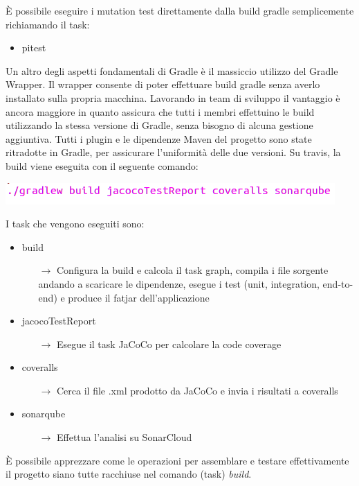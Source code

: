 È possibile eseguire i mutation test direttamente dalla build gradle semplicemente richiamando il task:
\begin{itemize}
	\item pitest
\end{itemize}
\vspace{0.5cm}

Un altro degli aspetti fondamentali di Gradle è il massiccio utilizzo del Gradle Wrapper.\newline
Il wrapper consente di poter effettuare build gradle senza averlo installato sulla propria macchina. Lavorando in team di sviluppo il vantaggio è ancora maggiore in quanto assicura che tutti i membri effettuino le build utilizzando la stessa versione di Gradle, senza bisogno di alcuna gestione aggiuntiva.\newline\newline
Tutti i plugin e le dipendenze Maven del progetto sono state ritradotte in Gradle, per assicurare l'uniformità delle due versioni. Su travis, la build viene eseguita con il seguente comando:\newline

\begin{minipage}{\linewidth}
	\includegraphics[width=\textwidth]{img/gradle-build.png}
\end{minipage}
\newline\newline
I task che vengono eseguiti sono:
\begin{itemize}
	\item build
	\begin{itemize}
		\item[$\rightarrow$] Configura la build e calcola il task graph, compila i file sorgente andando a scaricare le dipendenze, esegue i test (unit, integration, end-to-end) e produce il fatjar dell'applicazione
	\end{itemize}
	\item jacocoTestReport
	\begin{itemize}
		\item[$\rightarrow$] Esegue il task JaCoCo per calcolare la code coverage
	\end{itemize}
	\item coveralls
	\begin{itemize}
		\item[$\rightarrow$] Cerca il file .xml prodotto da JaCoCo e invia i risultati a coveralls
	\end{itemize}
	\item sonarqube
	\begin{itemize}
		\item[$\rightarrow$] Effettua l'analisi su SonarCloud
	\end{itemize}
\end{itemize}
È possibile apprezzare come le operazioni per assemblare e testare effettivamente il progetto siano tutte racchiuse nel comando (task) \textsl{build}.

